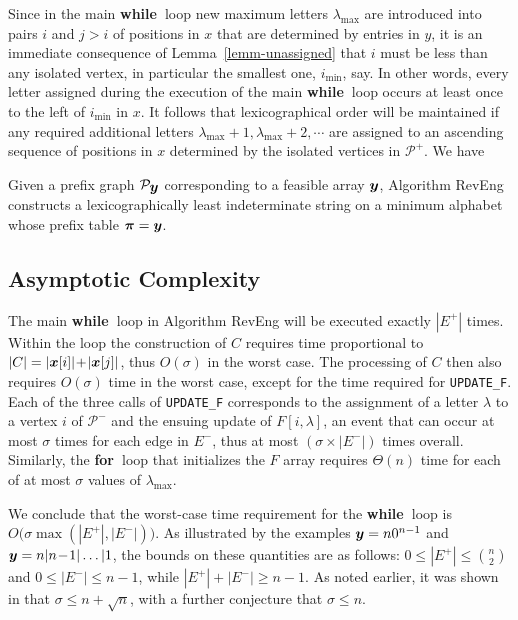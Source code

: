 \documentclass[runningheads,a4paper]{llncs}
\def\s#1{\mbox{\boldmath $#1$}}
\def\+{\!+\!}
\def\-{\!-\!}
\def\bfor{{\bf for\ }}
\def\bwhile{{\bf while\ }}
\begin{document}
Since in the main \bwhile loop
new maximum letters $\lambda_{\max}$ are introduced into pairs
$i$ and $j > i$ of positions in \s{x} that are
determined by entries in \s{y},
it is an immediate consequence of Lemma~\ref{lemm-unassigned}
that $i$
must be less than any isolated vertex,
in particular the smallest one, $i_{\min}$, say.
In other words, every letter assigned during the execution of the main \bwhile loop
occurs at least once to the left of $i_{\min}$ in \s{x}.
It follows that lexicographical order will be maintained
if any required additional letters $\lambda_{\max}\+ 1, \lambda_{\max}\+ 2, \cdots$
are assigned to an ascending sequence of positions in \s{x}
determined by the isolated vertices in $\mathcal{P}^+$.
We have
\begin{lemma}
Given a prefix graph $\mathcal{P}_{\s{y}}$ corresponding to a feasible array $\s{y}$, Algorithm RevEng constructs a lexicographically least indeterminate string
on a minimum alphabet whose prefix table $\s{\pi} = \s{y}$.
\end{lemma}

\subsection{Asymptotic Complexity}
The main \bwhile loop in Algorithm RevEng will be executed exactly $|E^+|$
times.
Within the loop the construction of $C$
requires time proportional to $|C| = |\s{x}[i]|\+ |\s{x}[j]|$,
thus $O(\sigma)$ in the worst case.
The processing of $C$ then also requires $O(\sigma)$ time
in the worst case, except for the time required for {\tt UPDATE\_F}.
Each of the three calls of {\tt UPDATE\_F}
corresponds to the assignment of a letter $\lambda$ to a vertex $i$ of $\mathcal{P}^-$
and the ensuing update of $F[i,\lambda]$,
an event that can occur at most $\sigma$ times for each edge in $E^-$,
thus at most $(\sigma \times |E^-|)$ times overall.
Similarly, the \bfor loop that initializes the $F$ array
requires $\Theta(n)$ time for each of at most $\sigma$ values of $\lambda_{\max}$.

We conclude that the worst-case time requirement for the \bwhile loop
is $O\big(\sigma\max(|E^+|,|E^-|)\big)$.
As illustrated by the examples
$\s{y} = n0^{n-1}$ and $\s{y} = n|n\- 1|\ldots|1$,
the bounds on these quantities are as follows:
$0 \le |E^+|\le \binom{n}{2}$ and $0 \le |E^-| \le n\- 1$,
while $|E^+|\+ |E^-| \ge n\- 1$.
As noted earlier, it was shown in \cite{BBD14} that
$\sigma \le n\+ \sqrt{n}$, with a further conjecture that
$\sigma \le n$.
\end{document}
